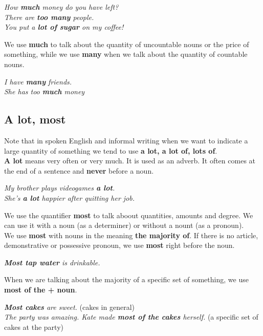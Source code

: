 \documentclass[10pt,a4paper]{article}
\begin{document}
\begin{center}
	\textit{How \textbf{much} money do you have left? \\
	There are \textbf{too many} people. \\
	You put a \textbf{lot of sugar} on my coffee! }
\end{center}

We use \textbf{much} to talk about the quantity of uncountable nouns or the price of something, while we use \textbf{many} when we talk about the quantity of countable nouns.
\begin{center}
	\textit{I have \textbf{many} friends. \\
	She has too \textbf{much}  money }
\end{center}

\subsection{A lot, most}
Note that in spoken English and informal writing when we want to indicate a large quantity of something we tend to use \textbf{ a lot, a lot of, lots of}.\\

\textbf{A lot} means very often or very much. It is used as an adverb. It often comes at the end of a sentence and \textbf{never} before a noun.

\begin{center}
	\textit{My brother plays videogames \textbf{a lot}. \\
	She's \textbf{a lot} happier after quitting her job. }
\end{center}

We use the quantifier \textbf{most} to talk aboout quantities, amounts and degree. We can use it with a noun (as a determiner) or without a nount (as a pronoun). \\

We use \textbf{most} with nouns in the meaning \textbf{the majority of}. If there is no article, demonstrative or possessive pronoun, we use \textbf{most} right before the noun.
 \begin{center}
 	\textit{ \textbf{Most tap water} is drinkable. }
 \end{center}

When we are talking about the majority of a specific set of something, we use \textbf{most of the + noun}.

\begin{center}
	\textit{ \textbf{Most cakes} are sweet. } (cakes in general) \\
	\textit{ The party was amazing. Kate made \textbf{most of the cakes} herself. } (a specific set of cakes at the party)
\end{center}
\end{document}
